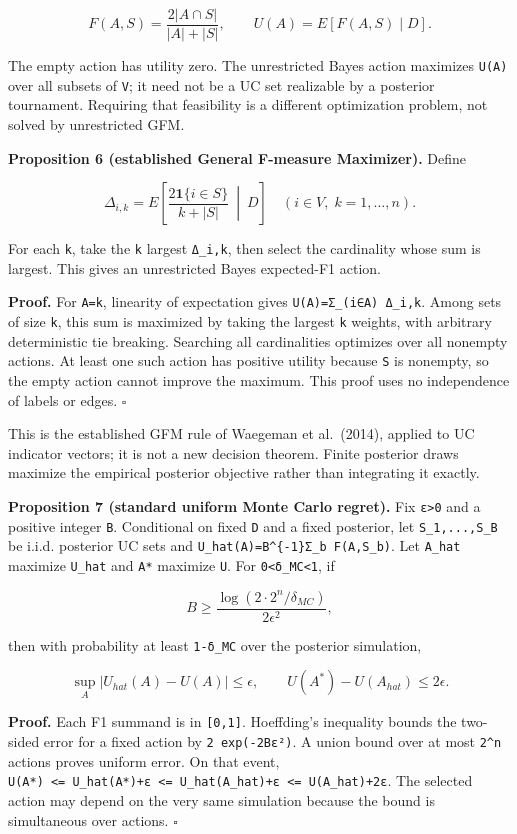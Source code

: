 \documentclass[
  11pt,
]{article}
\begin{document}
\[
F(A,S)=\frac{2|A\cap S|}{|A|+|S|},\qquad
U(A)=E[F(A,S)\mid D].
\]

The empty action has utility zero. The unrestricted Bayes action
maximizes \texttt{U(A)} over all subsets of \texttt{V}; it need not be a
UC set realizable by a posterior tournament. Requiring that feasibility
is a different optimization problem, not solved by unrestricted GFM.

\textbf{Proposition 6 (established General F-measure Maximizer).} Define

\[
\Delta_{i,k}=E\!\left[\frac{2\mathbf1\{i\in S\}}{k+|S|}\ \middle|\ D\right]
\quad (i\in V,\;k=1,\ldots,n).
\]

For each \texttt{k}, take the \texttt{k} largest \texttt{Δ\_i,k}, then
select the cardinality whose sum is largest. This gives an unrestricted
Bayes expected-F1 action.

\textbf{Proof.} For \texttt{\textbar{}A\textbar{}=k}, linearity of
expectation gives \texttt{U(A)=Σ\_(i∈A)\ Δ\_i,k}. Among sets of size
\texttt{k}, this sum is maximized by taking the largest \texttt{k}
weights, with arbitrary deterministic tie breaking. Searching all
cardinalities optimizes over all nonempty actions. At least one such
action has positive utility because \texttt{S} is nonempty, so the empty
action cannot improve the maximum. This proof uses no independence of
labels or edges. \(\square\)

This is the established GFM rule of Waegeman et al.~(2014), applied to
UC indicator vectors; it is not a new decision theorem. Finite posterior
draws maximize the empirical posterior objective rather than integrating
it exactly.

\textbf{Proposition 7 (standard uniform Monte Carlo regret).} Fix
\texttt{ε\textgreater{}0} and a positive integer \texttt{B}. Conditional
on fixed \texttt{D} and a fixed posterior, let \texttt{S\_1,...,S\_B} be
i.i.d. posterior UC sets and
\texttt{U\_hat(A)=B\^{}\{-1\}Σ\_b\ F(A,S\_b)}. Let \texttt{A\_hat}
maximize \texttt{U\_hat} and \texttt{A*} maximize \texttt{U}. For
\texttt{0\textless{}δ\_MC\textless{}1}, if

\[
B\ge \frac{\log(2\cdot2^n/\delta_{MC})}{2\epsilon^2},
\]

then with probability at least \texttt{1-δ\_MC} over the posterior
simulation,

\[
\sup_A|U_{hat}(A)-U(A)|\le\epsilon,\qquad
U(A^*)-U(A_{hat})\le2\epsilon.
\]

\textbf{Proof.} Each F1 summand is in \texttt{{[}0,1{]}}. Hoeffding's
inequality bounds the two-sided error for a fixed action by
\texttt{2\ exp(-2Bε²)}. A union bound over at most \texttt{2\^{}n}
actions proves uniform error. On that event,
\texttt{U(A*)\ \textless{}=\ U\_hat(A*)+ε\ \textless{}=\ U\_hat(A\_hat)+ε\ \textless{}=\ U(A\_hat)+2ε}.
The selected action may depend on the very same simulation because the
bound is simultaneous over actions. \(\square\)
\end{document}
